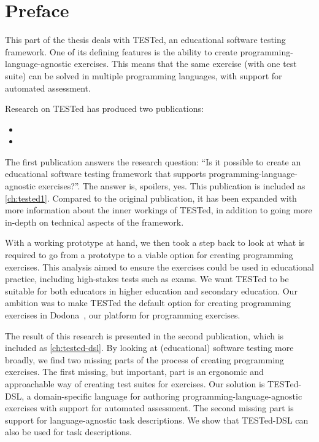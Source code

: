 \documentclass[./main]{subfiles}
\begin{document}
\chapter*{Preface}


This part of the thesis deals with TESTed, an educational software testing framework.
One of its defining features is the ability to create programming-language-agnostic exercises.
This means that the same exercise (with one test suite) can be solved in multiple programming languages, with support for automated assessment.

Research on TESTed has produced two publications:

\begin{itemize}
    \item {}
    \item {}
\end{itemize}

The first publication answers the research question: ``Is it possible to create an educational software testing framework that supports programming-language-agnostic exercises?''.
The answer is, spoilers, yes.
This publication is included as \cref{ch:tested1}.
Compared to the original publication, it has been expanded with more information about the inner workings of TESTed, in addition to going more in-depth on technical aspects of the framework.

With a working prototype at hand, we then took a step back to look at what is required to go from a prototype to a viable option for creating programming exercises.
This analysis aimed to ensure the exercises could be used in educational practice, including high-stakes tests such as exams.
We want TESTed to be suitable for both educators in higher education and secondary education.
Our ambition was to make TESTed the default option for creating programming exercises in Dodona~\autocite{vanpetegemDodonaLearnCode2023}, our platform for programming exercises.

The result of this research is presented in the second publication, which is included as \cref{ch:tested-dsl}.
By looking at (educational) software testing more broadly, we find two missing parts of the process of creating programming exercises.
The first missing, but important, part is an ergonomic and approachable way of creating test suites for exercises.
Our solution is TESTed-DSL, a domain-specific language for authoring programming-language-agnostic exercises with support for automated assessment.
The second missing part is support for language-agnostic task descriptions.
We show that TESTed-DSL can also be used for task descriptions.
\end{document}
